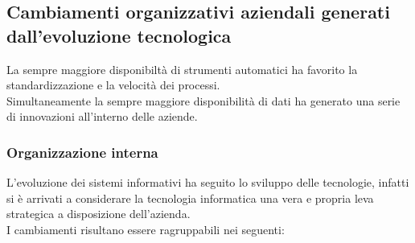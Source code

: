 \documentclass[../main.tex]{subfiles}
\begin{document}
	\subsection{Cambiamenti organizzativi aziendali generati dall'evoluzione tecnologica}
	La sempre maggiore disponibiltà di strumenti automatici ha favorito la standardizzazione e la velocità dei processi.\\
	Simultaneamente la sempre maggiore disponibilità di dati ha generato una serie di innovazioni all'interno delle aziende.\\
	\subsubsection{Organizzazione interna}
	L'evoluzione dei sistemi informativi ha seguito lo sviluppo delle tecnologie, infatti si è arrivati a considerare la tecnologia informatica una vera e propria leva strategica a disposizione dell'azienda.\\
	I cambiamenti risultano essere ragruppabili nei seguenti:
\end{document}
